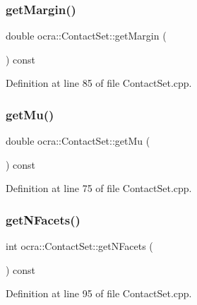 \subsubsection{\texorpdfstring{get\+Margin()}{getMargin()}}
{\footnotesize\ttfamily double ocra\+::\+Contact\+Set\+::get\+Margin (\begin{DoxyParamCaption}{ }\end{DoxyParamCaption}) const}



Definition at line 85 of file Contact\+Set.\+cpp.

\hypertarget{classocra_1_1ContactSet_a8583db2b548f1fe3467115a1f2347c5f}{}\label{classocra_1_1ContactSet_a8583db2b548f1fe3467115a1f2347c5f} 
\subsubsection{\texorpdfstring{get\+Mu()}{getMu()}}
{\footnotesize\ttfamily double ocra\+::\+Contact\+Set\+::get\+Mu (\begin{DoxyParamCaption}{ }\end{DoxyParamCaption}) const}



Definition at line 75 of file Contact\+Set.\+cpp.

\hypertarget{classocra_1_1ContactSet_a0fa75dacb675c0133326ba27a63d4070}{}\label{classocra_1_1ContactSet_a0fa75dacb675c0133326ba27a63d4070} 
\subsubsection{\texorpdfstring{get\+N\+Facets()}{getNFacets()}}
{\footnotesize\ttfamily int ocra\+::\+Contact\+Set\+::get\+N\+Facets (\begin{DoxyParamCaption}{ }\end{DoxyParamCaption}) const}



Definition at line 95 of file Contact\+Set.\+cpp.

\hypertarget{classocra_1_1ContactSet_ab0d2830d5710e02f1807033cbc9ba956}{}\label{classocra_1_1ContactSet_ab0d2830d5710e02f1807033cbc9ba956} 
